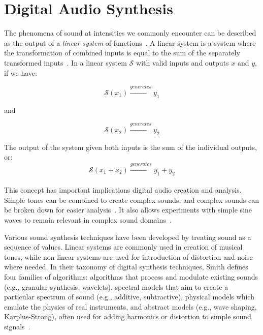 \documentclass[\main/thesis.tex]{subfiles}
\begin{document}
\section{Digital Audio Synthesis}
\label{sec_digital_synthesis}
The phenomena of sound at intensities we commonly encounter can be described as the output of a \textit{linear system} of functions~\cite{cook1999chap4}. A linear system is a system where the transformation of combined inputs is equal to the sum of the separately transformed inputs~\cite{lyons2004understandingChap1,cook1999chap4}. In a linear system $\mathcal{S}$ with valid inputs and outputs $x$ and $y$, if we have:

\begin{equation}
 \mathcal{S}(x_1) \xrightarrow{generates} y_1
\end{equation}
\begin{center}
    and
\end{center}
\begin{equation}
\mathcal{S}(x_2) \xrightarrow{generates}y_2
\end{equation}

The output of the system given both inputs is the sum of the individual outputs, or:
\begin{equation}
 \mathcal{S}(x_1+x_2) \xrightarrow{generates} y_1+y_2 
\end{equation}
\\
This concept has important implications digital audio creation and analysis. Simple tones can be combined to create complex sounds, and complex sounds can be broken down for easier analysis~\cite{lyons2004understandingChap1}. It also allows experiments with simple sine waves to remain relevant in complex sound domains~\cite{cook1999chap4}.


Various sound synthesis techniques have been developed by treating sound as a sequence of values. Linear systems are commonly used in creation of musical tones, while non-linear systems are used for introduction of distortion and noise where needed. In their taxonomy of digital synthesis techniques, Smith defines four families of algorithms: algorithms that process and modulate existing sounds (e.g., granular synthesis, wavelets), spectral models that aim to create a particular spectrum of sound (e.g., additive, subtractive), physical models which emulate the physics of real instruments, and abstract models (e.g., wave shaping, Karplus-Strong), often used for adding harmonics or distortion to simple sound signals~\cite{smith1991viewpoints}. 
\end{document}
